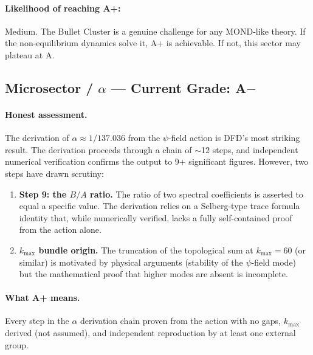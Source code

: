 \documentclass[11pt,a4paper]{article}
\begin{document}
\paragraph{Likelihood of reaching A+:} \textcolor{gradeBplus}{Medium}. The Bullet Cluster is a genuine challenge for any MOND-like theory. If the non-equilibrium dynamics solve it, A+ is achievable. If not, this sector may plateau at A.

\subsection{Microsector / $\alpha$ --- Current Grade: A$-$}

\paragraph{Honest assessment.}
The derivation of $\alpha \approx 1/137.036$ from the $\psi$-field action is DFD's most striking result. The derivation proceeds through a chain of $\sim$12 steps, and independent numerical verification confirms the output to 9+ significant figures. However, two steps have drawn scrutiny:
\begin{enumerate}[label=(\alph*)]
    \item \textbf{Step 9: the $B/A$ ratio.} The ratio of two spectral coefficients is asserted to equal a specific value. The derivation relies on a Selberg-type trace formula identity that, while numerically verified, lacks a fully self-contained proof from the action alone.
    \item \textbf{$k_{\max}$ bundle origin.} The truncation of the topological sum at $k_{\max} = 60$ (or similar) is motivated by physical arguments (stability of the $\psi$-field mode) but the mathematical proof that higher modes are absent is incomplete.
\end{enumerate}

\paragraph{What A+ means.}
Every step in the $\alpha$ derivation chain proven from the action with no gaps, $k_{\max}$ derived (not assumed), and independent reproduction by at least one external group.
\end{document}
